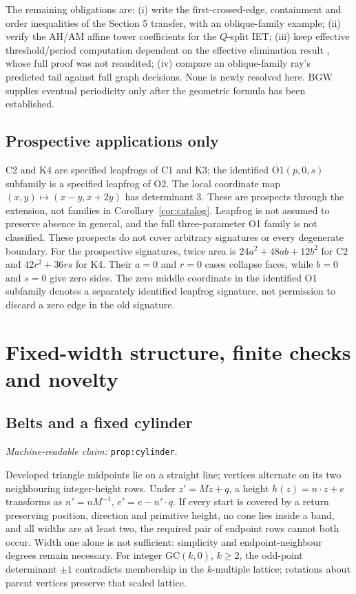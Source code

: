 \documentclass[11pt]{amsart}
\newcommand{\record}[1]{\nolinkurl{#1}}
\newcommand{\claimid}[1]{\par\nopagebreak\noindent\textit{Machine-readable claim:} \record{#1}.\par}
\theoremstyle{definition}\newtheorem{definition}{Definition}
\begin{document}
The remaining obligations are: (i) write the first-crossed-edge,
containment and order inequalities of the Section 5 transfer, with an
oblique-family example; (ii) verify the AH/AM affine tower coefficients
for the $Q$-split IET; (iii) keep effective threshold/period computation
dependent on the effective elimination result \cite{QE}, whose full
proof was not reaudited; (iv) compare an oblique-family ray's predicted
tail against full graph decisions. None is newly resolved here.
BGW supplies eventual periodicity only after the geometric formula
has been established.

\subsection{Prospective applications only}
C2 and K4 are specified leapfrogs of C1 and K3; the identified O1$(p,0,s)$
subfamily is a specified leapfrog of O2. The local coordinate map
$(x,y)\mapsto(x-y,x+2y)$ has determinant 3. These are prospects through
the extension, not families in Corollary~\ref{cor:catalog}. Leapfrog
is not assumed to preserve absence in general, and the full
three-parameter O1 family is not classified. These prospects do not
cover arbitrary signatures or every degenerate boundary. For the prospective signatures, twice area is $24a^2+48ab+12b^2$ for C2 and $42r^2+36rs$ for K4. Their $a=0$ and $r=0$ cases collapse faces, while $b=0$ and $s=0$ give zero sides. The zero middle coordinate in the identified O1 subfamily denotes a separately identified leapfrog signature, not permission to discard a zero edge in the old signature.

\section{Fixed-width structure, finite checks and novelty}\label{sec:evidence}
\subsection{Belts and a fixed cylinder}\label{prop:cylinder}
\claimid{prop:cylinder}
Developed triangle midpoints lie on a straight line; vertices alternate
on its two neighbouring integer-height rows. Under $z'=Mz+q$, a height
$h(z)=n\cdot z+e$ transforms as $n'=nM^{-1}$,
$e'=e-n'\cdot q$. If every start is covered by a return preserving
position, direction and primitive height, no cone lies inside a band,
and all widths are at least two, the required pair of endpoint rows
cannot both occur. Width one alone is not sufficient: simplicity and
endpoint-neighbour degrees remain necessary. For integer GC$(k,0)$,
$k\ge2$, the odd-point determinant $\pm1$ contradicts membership in
the $k$-multiple lattice; rotations about parent vertices preserve that
scaled lattice.
\end{document}
